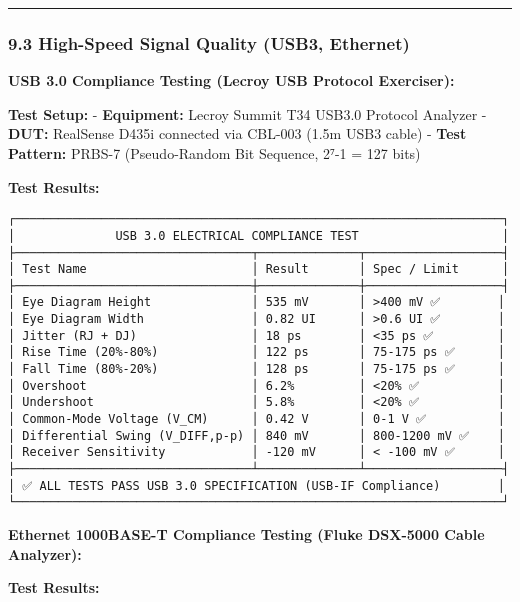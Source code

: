 \documentclass[
]{article}
\begin{document}
\begin{center}\rule{0.5\linewidth}{0.5pt}\end{center}

\hypertarget{high-speed-signal-quality-usb3-ethernet}{%
\subsubsection{9.3 High-Speed Signal Quality (USB3,
Ethernet)}\label{high-speed-signal-quality-usb3-ethernet}}

\textbf{USB 3.0 Compliance Testing (Lecroy USB Protocol Exerciser):}

\textbf{Test Setup:} - \textbf{Equipment:} Lecroy Summit T34 USB3.0
Protocol Analyzer - \textbf{DUT:} RealSense D435i connected via CBL-003
(1.5m USB3 cable) - \textbf{Test Pattern:} PRBS-7 (Pseudo-Random Bit
Sequence, 2⁷-1 = 127 bits)

\textbf{Test Results:}

\begin{verbatim}
┌────────────────────────────────────────────────────────────────────┐
│              USB 3.0 ELECTRICAL COMPLIANCE TEST                    │
├─────────────────────────────────┬──────────────┬───────────────────┤
│ Test Name                       │ Result       │ Spec / Limit      │
├─────────────────────────────────┼──────────────┼───────────────────┤
│ Eye Diagram Height              │ 535 mV       │ >400 mV ✅        │
│ Eye Diagram Width               │ 0.82 UI      │ >0.6 UI ✅        │
│ Jitter (RJ + DJ)                │ 18 ps        │ <35 ps ✅         │
│ Rise Time (20%-80%)             │ 122 ps       │ 75-175 ps ✅      │
│ Fall Time (80%-20%)             │ 128 ps       │ 75-175 ps ✅      │
│ Overshoot                       │ 6.2%         │ <20% ✅           │
│ Undershoot                      │ 5.8%         │ <20% ✅           │
│ Common-Mode Voltage (V_CM)      │ 0.42 V       │ 0-1 V ✅          │
│ Differential Swing (V_DIFF,p-p) │ 840 mV       │ 800-1200 mV ✅    │
│ Receiver Sensitivity            │ -120 mV      │ < -100 mV ✅      │
├─────────────────────────────────┴──────────────┴───────────────────┤
│ ✅ ALL TESTS PASS USB 3.0 SPECIFICATION (USB-IF Compliance)        │
└────────────────────────────────────────────────────────────────────┘
\end{verbatim}

\textbf{Ethernet 1000BASE-T Compliance Testing (Fluke DSX-5000 Cable
Analyzer):}

\textbf{Test Results:}
\end{document}
